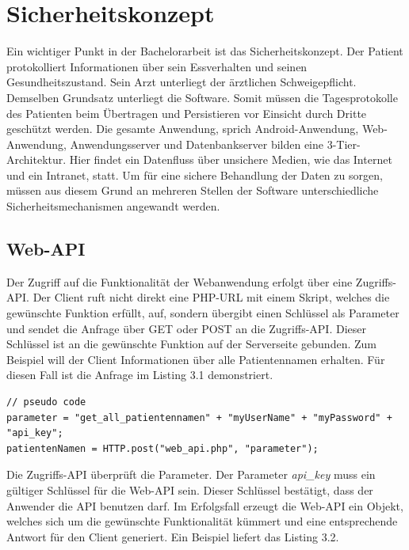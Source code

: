 \section{Sicherheitskonzept}

Ein wichtiger Punkt in der Bachelorarbeit ist das Sicherheitskonzept.
Der Patient protokolliert Informationen \"uber sein Essverhalten und seinen Gesundheitszustand.
Sein Arzt unterliegt der \"arztlichen Schweigepflicht.
Demselben Grundsatz unterliegt die Software.
Somit m\"ussen die Tagesprotokolle des Patienten beim \"Ubertragen und Persistieren vor Einsicht durch Dritte gesch\"utzt werden.
Die gesamte Anwendung, sprich Android-Anwendung, Web-Anwendung, Anwendungsserver und Datenbankserver bilden eine 3-Tier-Architektur.
Hier findet ein Datenfluss \"uber unsichere Medien, wie das Internet und ein Intranet, statt.
Um f\"ur eine sichere Behandlung der Daten zu sorgen, m\"ussen aus diesem Grund an mehreren Stellen der Software unterschiedliche Sicherheitsmechanismen angewandt werden.\\

\subsection{Web-API}

Der Zugriff auf die Funktionalit\"at der Webanwendung erfolgt \"uber eine Zugriffs-API.
Der Client ruft nicht direkt eine PHP-URL mit einem Skript, welches die gew\"unschte Funktion erf\"ullt, auf,
sondern \"ubergibt einen Schl\"ussel als Parameter und sendet die Anfrage \"uber GET oder POST an die Zugriffs-API.
Dieser Schl\"ussel ist an die gew\"unschte Funktion auf der Serverseite gebunden.
Zum Beispiel will der Client Informationen \"uber alle Patientennamen erhalten.
F\"ur diesen Fall ist die Anfrage im Listing 3.1 demonstriert.\\

\begin{lstlisting}[caption={Beispiel f\"ur einen Zugriff \"uber eine Zugriffs-API}]
// pseudo code
parameter = "get_all_patientennamen" + "myUserName" + "myPassword" + "api_key";
patientenNamen = HTTP.post("web_api.php", "parameter");
\end{lstlisting}

Die Zugriffs-API \"uberpr\"uft die Parameter.
Der Parameter \emph{api\_key} muss ein g\"ultiger Schl\"ussel f\"ur die Web-API sein.
Dieser Schl\"ussel best\"atigt, dass der Anwender die API benutzen darf.
Im Erfolgsfall erzeugt die Web-API ein Objekt, welches sich um die gew\"unschte Funktionalit\"at k\"ummert und 
eine entsprechende Antwort f\"ur den Client generiert.
Ein Beispiel liefert das Listing 3.2.\\


